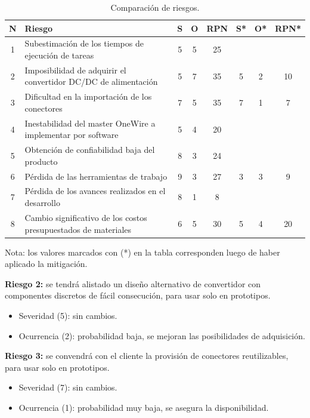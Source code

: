 \documentclass[
11pt, %
codirector, %
]{charter}
\begin{document}
\begin{table}[htpb]
\centering
\begin{tabularx}{\linewidth}{@{}|c|X|c|c|c|c|c|c|@{}}
\hline
\rowcolor[HTML]{C0C0C1} 
N & Riesgo & S & O & RPN & S* & O* & RPN* \\ \hline
1& Subestimación de los tiempos de ejecución de tareas& 5 & 5 & 25 &    &    &      \\ \hline
2& Imposibilidad de adquirir el convertidor DC/DC de alimentación& 5& 7&\cellcolor[rgb]{1,.4,0} 35& 5& 2& \cellcolor[rgb]{0,0.7,0}10 \\ \hline
3& Dificultad en la importación de los conectores& 7& 5&\cellcolor[rgb]{1,.4,0} 35& 7& 1& \cellcolor[rgb]{0,0.7,0}7      \\ \hline
4& Inestabilidad del master OneWire a implementar por software& 5& 4& 20&    &    &      \\ \hline
5& Obtención de confiabilidad baja del producto& 8& 3& 24&    &    &      \\ \hline
6& Pérdida de las herramientas de trabajo& 9& 3&\cellcolor[rgb]{1,.4,0} 27& 3& 3&\cellcolor[rgb]{0,0.7,0} 9  \\ \hline
7& Pérdida de los avances realizados en el desarrollo& 8& 1& 8&    &    &      \\ \hline
8& Cambio significativo de los costos presupuestados de materiales& 6& 5&\cellcolor[rgb]{1,.4,0} 30& 5& 4& \cellcolor[rgb]{0,0.7,0} 20   \\ \hline
\end{tabularx}%
\caption{Comparación de riesgos.}
\end{table}

Nota: los valores marcados con (*) en la tabla corresponden luego de haber aplicado la mitigación.

\textbf{Riesgo 2:} se tendrá alistado un diseño alternativo de convertidor con componentes discretos de fácil consecución, para usar solo en prototipos.
  \begin{itemize}
		\item Severidad (5): sin cambios.
		\item Ocurrencia (2): probabilidad baja, se mejoran las posibilidades de adquisición. 
		\end{itemize} 
\textbf{Riesgo 3:} se convendrá con el cliente la provisión de conectores reutilizables, para usar solo en prototipos.
  \begin{itemize}
		\item Severidad (7): sin cambios.
		\item Ocurrencia (1): probabilidad muy baja, se asegura la disponibilidad. 
		\end{itemize}
 
\end{document}
